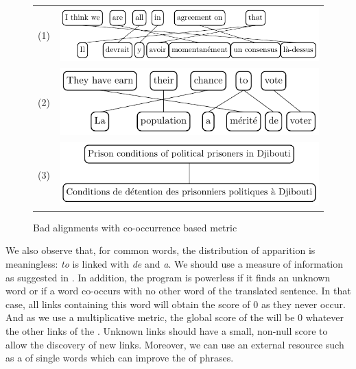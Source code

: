 \documentclass[output=paper,modfonts,nonflat]{langsci/langscibook}
\begin{document}
\begin{figure}
\centering
\begin{tabular}{lC}
(1) & \includegraphics[scale=.9]{figures/figSemmar4} \\[1ex]
(2) & \includegraphics[scale=.9]{figures/figSemmar5} \\[1ex]
(3) & \includegraphics[scale=.9]{figures/figSemmar6} \\
\end{tabular}
\caption{\label{sem:fig:badali}Bad alignments with co-occurrence based metric}
\end{figure}

We also observe that, for common words, the distribution of apparition is meaningless: \textit{to} is linked with \textit{de} and \textit{a}. 
We should use a measure of information as suggested in \citet{gao1998automatic}.
In addition, the program is powerless if it finds an unknown word or if a word co-occurs with no other word of the translated sentence. 
In that case, all links containing this word will obtain the score of 0 as they never occur. 
And as we use a multiplicative metric, the global score of the  will be 0 whatever the other links of the . Unknown links should have a small, non-null score to allow the discovery of new links. 
Moreover, we can use an external resource such as a  of single words which can improve the  of phrases.
\end{document}
